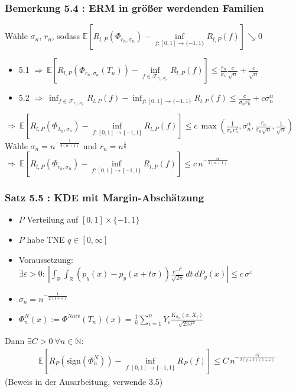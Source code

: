 \documentclass{beamer}
\newcommand{\R}{\mathbb{R}} %
\newcommand{\N}{\mathbb{N}} %
\newcommand{\E}{\mathbb{E}} %
\newcommand{\F}{\mathcal{F}}
\begin{document}
	\begin{frame}
		\frametitle{Bemerkung 5.4 : ERM in größer werdenden Familien}
		Wähle $\sigma_n$, $r_n$, sodass $\E\left[ R_{l,P}(\Phi_{r_n,\sigma_n}) - \inf\limits_{f:[0,1] \rightarrow \{-1,1\}} R_{l,P}(f) \right] \searrow 0$
		\begin{itemize}
			\item 5.1 $\Rightarrow \ \E \left[ R_{l,P}(\Phi_{r_n,\sigma_n}(T_n)) - \inf\limits_{f \in \F_{r_n,\sigma_n}} R_{l,P}(f) \right] \leq \frac{r_n}{\sigma_n} \frac{c}{\sqrt{n}} + \frac{c}{\sqrt{n}}$
			\item 5.2 $\Rightarrow \ \inf_{f \in \F_{r_n,\sigma_n}} R_{l,P}(f) - \inf_{f:[0,1] \rightarrow \{-1,1\}}R_{l,P}(f) \leq \frac{c}{\sigma_n r_n^2} + c \sigma_n^{\alpha}$
		\end{itemize}
		\pause
		$\Rightarrow \ \E\left[ R_{l,P}(\Phi_{\lambda_n,\sigma_n}) - \inf\limits_{f:[0,1] \rightarrow \{-1,1\}} R_{l,P}(f) \right] \leq c\, \max\left( \frac{1}{\sigma_n r_n^2} , \sigma_n^\alpha , \frac{r_n}{\sigma_n \sqrt{n}} , \frac{1}{\sqrt{n}} \right)$
		Wähle $\sigma_n = n^{-\frac{1}{3(\alpha+1)}}$ und $r_n = n^{\frac{1}{6}}$\\
		$\Rightarrow \ \E\left[ R_{l,P}(\Phi_{r_n,\sigma_n}) - \inf\limits_{f:[0,1] \rightarrow \{-1,1\}} R_{l,P}(f) \right] \leq c\, n^{-\frac{\alpha}{3(\alpha+1)}}$
	\end{frame}

	\begin{frame}
		\frametitle{Satz 5.5 : KDE mit Margin-Abschätzung}
		\begin{itemize}
			\item $P$ Verteilung auf $[0,1]\times \{-1,1\}$
			\item $P$ habe TNE $q \in [0,\infty]$
			\item Voraussetzung: $\exists \varepsilon > 0 : \ \left| \int_\R \int_\R (p_y(x) - p_y(x+t\sigma)) \frac{e^{-t^2}}{\sqrt{2\pi}} \, dt \, dP_y(x) \right| \leq c\, \sigma^{\varepsilon}$
			\item $\sigma_n = n^{-\frac{1}{2(1+\varepsilon)}}$
			\item $\Phi^N_n(x) := \Phi^{Naiv}(T_n)(x) = \frac{1}{n} \sum\limits_{i=1}^n Y_i \frac{K_{\sigma_n}(x,X_i)}{\sqrt{2\pi\sigma^2}}$
			
		\end{itemize}
		\pause
		Dann $\exists C > 0 \ \forall n \in \N :$
		\begin{align*}
		& \E\left[ R_P(\text{sign}(\Phi_n^N)) - \inf_{f:[0,1] \rightarrow \{-1,1\}} R_P(f) \right] \leq C\, n^{-\frac{\varepsilon q}{2(q+1)(1+\varepsilon)}}
		\end{align*}
		(Beweis in der Ausarbeitung, verwende 3.5)
	\end{frame}
\end{document}
